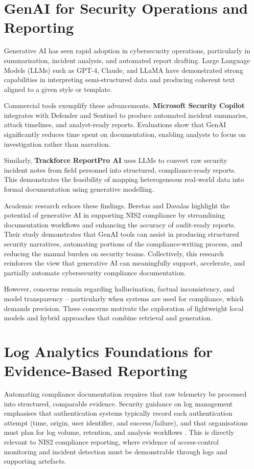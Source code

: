 \documentclass[]{UCD_CS_FYP_Report}
\begin{document}
\section{GenAI for Security Operations and Reporting}
\label{sec:genai_security_operations}
        Generative AI has seen rapid adoption in cybersecurity operations, particularly in summarisation, incident analysis, and automated report drafting. Large Language Models (LLMs) such as GPT-4, Claude, and LLaMA have demonstrated strong capabilities in interpreting semi-structured data and producing coherent text aligned to a given style or template.

        Commercial tools exemplify these advancements. \textbf{Microsoft Security Copilot}\cite{MicrosoftSecurityCopilot2024} integrates with Defender and Sentinel to produce automated incident summaries, attack timelines, and analyst-ready reports. Evaluations show that GenAI significantly reduces time spent on documentation, enabling analysts to focus on investigation rather than narration.

        Similarly, \textbf{Trackforce ReportPro AI}\cite{TrackforceReportPro2025} uses LLMs to convert raw security incident notes from field personnel into structured, compliance-ready reports. This demonstrates the feasibility of mapping heterogeneous real-world data into formal documentation using generative modelling.

        Academic research echoes these findings. Beretas and Davalas \cite{Beretas2024NIS2AI} highlight the potential of generative AI in supporting NIS2 compliance by streamlining documentation workflows and enhancing the accuracy of audit-ready reports. Their study demonstrates that GenAI tools can assist in producing structured security narratives, automating portions of the compliance-writing process, and reducing the manual burden on security teams. Collectively, this research reinforces the view that generative AI can meaningfully support, accelerate, and partially automate cybersecurity compliance documentation.

        However, concerns remain regarding hallucination, factual inconsistency, and model transparency -- particularly when systems are used for compliance, which demands precision. These concerns motivate the exploration of lightweight local models and hybrid approaches that combine retrieval and generation.

\section{Log Analytics Foundations for Evidence-Based Reporting}
\label{sec:log_analytics_foundations}
        Automating compliance documentation requires that raw telemetry be processed into structured, comparable evidence. Security guidance on log management emphasises that authentication systems typically record each authentication attempt (time, origin, user identifier, and success/failure), and that organisations must plan for log volume, retention, and analysis workflows \cite{NIST80092}. This is directly relevant to NIS2 compliance reporting, where evidence of access-control monitoring and incident detection must be demonstrable through logs and supporting artefacts.
\end{document}

